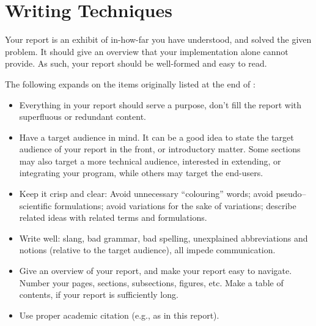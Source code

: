 \section{Writing Techniques}

\label{sec:writing-techniques}

Your report is an exhibit of in-how-far you have understood, and solved the
given problem. It should give an overview that your implementation alone cannot
provide. As such, your report should be well-formed and easy to read.

The following expands on the items originally listed at the end of
\cite{sestoft2002}:

\begin{itemize}

\item Everything in your report should serve a purpose, don't fill the report
with superfluous or redundant content.

\item Have a target audience in mind. It can be a good idea to state the target
audience of your report in the front, or introductory matter. Some sections may
also target a more technical audience, interested in extending, or integrating
your program, while others may target the end-users.

\item Keep it crisp and clear: Avoid unnecessary ``colouring'' words; avoid
pseudo–scientific formulations; avoid variations for the sake of variations;
describe related ideas with related terms and formulations.

\item Write well: slang, bad grammar, bad spelling, unexplained abbreviations
and notions (relative to the target audience), all impede communication.

\item Give an overview of your report, and make your report easy to navigate.
Number your pages, sections, subsections, figures, etc. Make a table of
contents, if your report is sufficiently long.

\item Use proper academic citation (e.g., as in this report).

\end{itemize}
